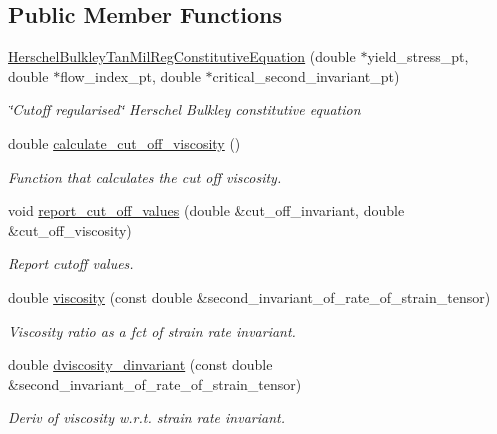 \subsection*{Public Member Functions}
\begin{DoxyCompactItemize}
\item 
\hyperlink{classoomph_1_1HerschelBulkleyTanMilRegConstitutiveEquation_a9d29fd9b5b414a0bb8bebd521ea48ea0}{Herschel\+Bulkley\+Tan\+Mil\+Reg\+Constitutive\+Equation} (double $\ast$yield\+\_\+stress\+\_\+pt, double $\ast$flow\+\_\+index\+\_\+pt, double $\ast$critical\+\_\+second\+\_\+invariant\+\_\+pt)
\begin{DoxyCompactList}\small\item\em \char`\"{}\+Cutoff regularised\char`\"{} Herschel Bulkley constitutive equation \end{DoxyCompactList}\item 
double \hyperlink{classoomph_1_1HerschelBulkleyTanMilRegConstitutiveEquation_a691613fc3cfa4bb2234dbc7eed260efc}{calculate\+\_\+cut\+\_\+off\+\_\+viscosity} ()
\begin{DoxyCompactList}\small\item\em Function that calculates the cut off viscosity. \end{DoxyCompactList}\item 
void \hyperlink{classoomph_1_1HerschelBulkleyTanMilRegConstitutiveEquation_a29fd020fb6b5120369d18d4d02daea81}{report\+\_\+cut\+\_\+off\+\_\+values} (double \&cut\+\_\+off\+\_\+invariant, double \&cut\+\_\+off\+\_\+viscosity)
\begin{DoxyCompactList}\small\item\em Report cutoff values. \end{DoxyCompactList}\item 
double \hyperlink{classoomph_1_1HerschelBulkleyTanMilRegConstitutiveEquation_af34701ebef214fb30dbc2813e66173b5}{viscosity} (const double \&second\+\_\+invariant\+\_\+of\+\_\+rate\+\_\+of\+\_\+strain\+\_\+tensor)
\begin{DoxyCompactList}\small\item\em Viscosity ratio as a fct of strain rate invariant. \end{DoxyCompactList}\item 
double \hyperlink{classoomph_1_1HerschelBulkleyTanMilRegConstitutiveEquation_a7b54c8c6374ba0bd80f5d51768701dc0}{dviscosity\+\_\+dinvariant} (const double \&second\+\_\+invariant\+\_\+of\+\_\+rate\+\_\+of\+\_\+strain\+\_\+tensor)
\begin{DoxyCompactList}\small\item\em Deriv of viscosity w.\+r.\+t. strain rate invariant. \end{DoxyCompactList}\end{DoxyCompactItemize}
